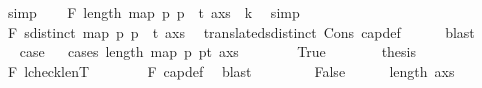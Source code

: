 \begin{isabellebody}
\ simp\isanewline
\ \ \isamarkupfalse%
\ F{}{\isacharcolon}{\kern0pt}\ {\isachardoublequoteopen}length\ {\isacharparenleft}{\kern0pt}map\ {\isacharparenleft}{\kern0pt}{\isasymlambda}p{\isachardot}{\kern0pt}\ p\ {\isacharplus}{\kern0pt}\ t{\isacharparenright}{\kern0pt}\ {\isacharparenleft}{\kern0pt}a{\isacharhash}{\kern0pt}xs{\isacharparenright}{\kern0pt}{\isacharparenright}{\kern0pt}\ {\isacharequal}{\kern0pt}\ k{\isachardoublequoteclose}\ \isamarkupfalse%
\ simp\isanewline
\ \ \isamarkupfalse%
\ F{}{\isacharcolon}{\kern0pt}\ {\isachardoublequoteopen}sdistinct\ {\isacharparenleft}{\kern0pt}map\ {\isacharparenleft}{\kern0pt}{\isasymlambda}p{\isachardot}{\kern0pt}\ p\ {\isacharplus}{\kern0pt}\ t{\isacharparenright}{\kern0pt}\ {\isacharparenleft}{\kern0pt}a{\isacharhash}{\kern0pt}xs{\isacharparenright}{\kern0pt}{\isacharparenright}{\kern0pt}{\isachardoublequoteclose}\ \isamarkupfalse%
\ translated{\isacharunderscore}{\kern0pt}sdistinct\ Cons{\isacharparenleft}{\kern0pt}{}{\isacharparenright}{\kern0pt}\ cap{\isacharunderscore}{\kern0pt}def\isanewline
\ \ \ \ \isamarkupfalse%
\ blast\isanewline
\ \ \isamarkupfalse%
\ \isamarkupfalse%
\ {\isacharquery}{\kern0pt}case\isanewline
\ \ \isamarkupfalse%
{\isacharparenleft}{\kern0pt}cases\ {\isachardoublequoteopen}length\ {\isacharparenleft}{\kern0pt}map\ {\isacharparenleft}{\kern0pt}{\isasymlambda}p{\isachardot}{\kern0pt}\ p{\isacharplus}{\kern0pt}t{\isacharparenright}{\kern0pt}\ {\isacharparenleft}{\kern0pt}a{\isacharhash}{\kern0pt}xs{\isacharparenright}{\kern0pt}{\isacharparenright}{\kern0pt}\ {\isasymle}\ {}{\isachardoublequoteclose}{\isacharparenright}{\kern0pt}\isanewline
\ \ \ \ \isamarkupfalse%
\ True\isanewline
\ \ \ \ \isamarkupfalse%
\ \isamarkupfalse%
\ {\isacharquery}{\kern0pt}thesis\ \isamarkupfalse%
\ F{}\ lcheck{\isacharunderscore}{\kern0pt}len{}{\isacharunderscore}{\kern0pt}T\isanewline
\ \ \ \ \ \ \isamarkupfalse%
\ F{}\ cap{\isacharunderscore}{\kern0pt}def\ \isamarkupfalse%
\ blast\isanewline
\ \ \isamarkupfalse%
\isanewline
\ \ \ \ \isamarkupfalse%
\ False\isanewline
\ \ \ \ \isamarkupfalse%
\ {\isachardoublequoteopen}length\ {\isacharparenleft}{\kern0pt}a{\isacharhash}{\kern0pt}xs{\isacharparenright}{\kern0pt}\ {\isasymge}\ {}{\isachardoublequoteclose}\ \isamarkupfalse%

\end{isabellebody}

